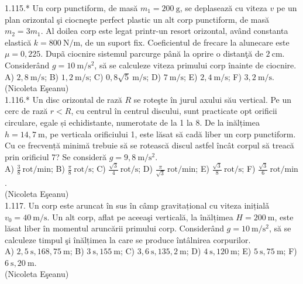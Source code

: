 1.115.* Un corp punctiform, de masă $m_{1}=200 \mathrm{~g}$, se deplasează cu viteza $v$ pe un plan orizontal şi ciocneşte perfect plastic un alt corp punctiform, de masă $m_{2}=3 m_{1}$. Al doilea corp este legat printr-un resort orizontal, având constanta elastică $k=800 \mathrm{~N} / \mathrm{m}$, de un suport fix. Coeficientul de frecare la alunecare este $\mu=0,225$. Dupã ciocnire sistemul parcurge până la oprire o distanţă de $2 \mathrm{~cm}$. Considerând $g=10 \mathrm{~m} / \mathrm{s}^{2}$, să se calculeze viteza primului corp înainte de ciocnire.\\ A) $2,8 \mathrm{~m} / \mathrm{s}$; B) $1,2 \mathrm{~m} / \mathrm{s}$; C) $0,8 \sqrt{5} \mathrm{~m} / \mathrm{s}$; D) $7 \mathrm{~m} / \mathrm{s}$; E) $2,4 \mathrm{~m} / \mathrm{s}$; F) $3,2 \mathrm{~m} / \mathrm{s}$.\\ (Nicoleta Eşeanu)\\

1.116.* Un disc orizontal de rază $R$ se roteşte în jurul axului său vertical. Pe un cerc de rază $r<R$, cu centrul în centrul discului, sunt practicate opt orificii circulare, egale și echidistante, numerotate de la 1 la 8. De la inălțimea $h=14,7 \mathrm{~m}$, pe verticala orificiului 1, este lăsat să cadă liber un corp punctiform. Cu ce frecvență minimă trebuie să se rotească discul astfel încât corpul să treacă prin orificiul 7? Se consideră $g=9,8 \mathrm{~m} / \mathrm{s}^{2}$.\\ A) $\frac{3}{8} \mathrm{~rot} / \mathrm{min}$; B) $\frac{\pi}{8} \mathrm{~rot} / \mathrm{s}$; C) $\frac{\sqrt{3}}{4} \mathrm{~rot} / \mathrm{s}$; D) $\frac{\pi}{\sqrt{3}} \mathrm{~rot} / \mathrm{min}$; E) $\frac{\sqrt{3}}{8} \mathrm{~rot} / \mathrm{s}$; F) $\frac{\sqrt{3}}{6} \mathrm{~rot} / \mathrm{min}$.\\ (Nicoleta Eşeanu)\\

1.117. Un corp este aruncat în sus în câmp gravitațional cu viteza inițialǎ $v_{0}=40 \mathrm{~m} / \mathrm{s}$. Un alt corp, aflat pe aceeaşi verticală, la înălțimea $H=200 \mathrm{~m}$, este lăsat liber în momentul aruncării primului corp. Considerând $g=10 \mathrm{~m} / \mathrm{s}^{2}$, să se calculeze timpul şi înălțimea la care se produce întâlnirea corpurilor.\\ A) $2,5 \mathrm{~s}, 168,75 \mathrm{~m}$; B) $3 \mathrm{~s}, 155 \mathrm{~m}$; C) $3,6 \mathrm{~s}, 135,2 \mathrm{~m}$; D) $4 \mathrm{~s}, 120 \mathrm{~m}$; E) $5 \mathrm{~s}, 75 \mathrm{~m}$; F) $6 \mathrm{~s}, 20 \mathrm{~m}$.\\ (Nicoleta Eşeanu)\\

